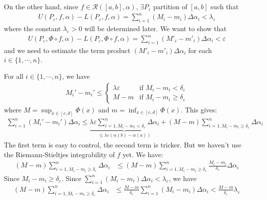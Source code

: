 \documentclass{tufte-handout}
\begin{document}
On the other hand,  since \( f \in \mathcal{R}([a,b], \alpha) \),
\(\exists P_\varepsilon \) partition of \([a,b]\) such that
\begin{align}
    U(P_\varepsilon, f, \alpha) - L(P_\varepsilon, f, \alpha) 
    = \sum_{i=1}^{n} (M_i - m_i) \Delta \alpha_i < \lambda_\varepsilon
\end{align}
where the constant \( \lambda_\varepsilon > 0 \) will be determined later.
We want to show that 
\begin{align}
 U(P_\varepsilon, \Phi \circ f, \alpha) - L(P_\varepsilon, \Phi \circ f, \alpha) 
 = \sum_{i=1}^{n} (M'_i - m'_i) \Delta \alpha_i < \varepsilon
\end{align}
and we need to estimate the term product \( (M'_i - m'_i) \Delta \alpha_i \) for each \( i \in \{1, \cdots, n\} \).

For all \( i \in \{1, \cdots, n\} \), we have
\begin{align}
    M_i' - m_i' \leq \begin{cases}
    \lambda\varepsilon & \text{if } M_i - m_i < \delta_\varepsilon\\
    M-m & \text{if } M_i - m_i \geq \delta_\varepsilon
    \end{cases}
\end{align}
where \( M = \sup_{x \in [c,d]}\Phi(x) \) and \( m = \inf_{x \in [c,d]}\Phi(x) \).
This gives:
\begin{align}
    \sum_{i=1}^{n}(M_i' - m_i')\Delta \alpha_i 
    \leq \underbrace{\lambda\varepsilon \sum_{i=1,M_i - m_i < \delta_\varepsilon}^{n}\Delta \alpha_i}_{
        \leq \lambda\varepsilon (\alpha(b) - \alpha(a))
    }
    + (M-m)\sum_{i=1, M_i - m_i \geq \delta_\varepsilon}^{n}\Delta \alpha_i
\end{align}
The first term is easy to control, the second term is tricker.
But we haven't use the Riemann-Stieltjes integrability of \( f \) yet.
We have:
\begin{align}
    (M-m)\sum_{i=1, M_i - m_i \geq \delta_\varepsilon}^{n}\Delta \alpha_i
    &\leq (M-m)\sum_{i=1, M_i - m_i \geq \delta_\varepsilon}^{n}\frac{M_i - m_i}{\delta_\varepsilon} \Delta \alpha_i
\end{align}
Since \(  M_i - m_i \geq \delta_\varepsilon\).
Since \( \sum_{i=1}^{n}(M_i - m_i)\Delta \alpha_i < \lambda_\varepsilon \), we have
\begin{align}
    (M-m)\sum_{i=1, M_i - m_i \geq \delta_\varepsilon}^{n}\Delta \alpha_i
    &\leq \frac{M-m}{\delta_\varepsilon} \sum_{i=1}^{n}(M_i - m_i)\Delta \alpha_i < \frac{M-m}{\delta_\varepsilon} \lambda_\varepsilon
\end{align}
\end{document}
